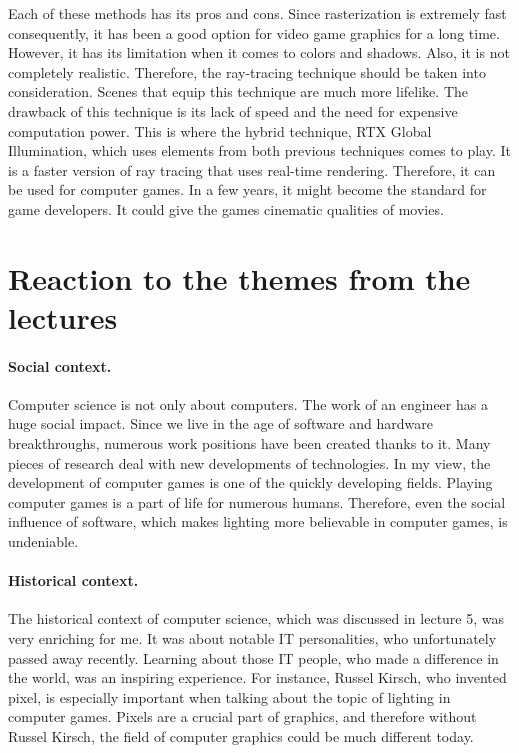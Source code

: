 \documentclass[10pt,twoside,english,a4paper]{article}
\begin{document}
Each of these methods has its pros and cons. Since rasterization is extremely fast consequently, it has been a good option for video game graphics for a long time. However, it has its limitation when it comes to colors and shadows. Also, it is not completely realistic. Therefore, the ray-tracing technique should be taken into consideration. Scenes that equip this technique are much more lifelike.\cite{wang} The drawback of this technique is its lack of speed and the need for expensive computation power. This is where the hybrid technique, RTX Global Illumination, which uses elements from both previous techniques comes to play. It is a faster version of ray tracing that uses real-time rendering. Therefore, it can be used for computer games. In a few years, it might become the standard for game developers. It could give the games cinematic qualities of movies.\cite{caulfield} 

\section{Reaction to the themes from the lectures} \label{sixth} 

\paragraph{Social context.}
Computer science is not only about computers. The work of an engineer has a huge social impact. Since we live in the age of software and hardware breakthroughs, numerous work positions have been created thanks to it. Many pieces of research deal with new developments of technologies. In my view, the development of computer games is one of the quickly developing fields. Playing computer games is a part of life for numerous humans. Therefore, even the social influence of software, which makes lighting more believable in computer games, is undeniable.

\paragraph{Historical context.}
The historical context of computer science, which was discussed in lecture 5, was very enriching for me. It was about notable IT personalities, who unfortunately passed away recently. Learning about those IT people, who made a difference in the world, was an inspiring experience. For instance, Russel Kirsch, who invented pixel, is especially important when talking about the topic of lighting in computer games. Pixels are a crucial part of graphics, and therefore without Russel Kirsch, the field of computer graphics could be much different today.
\end{document}
